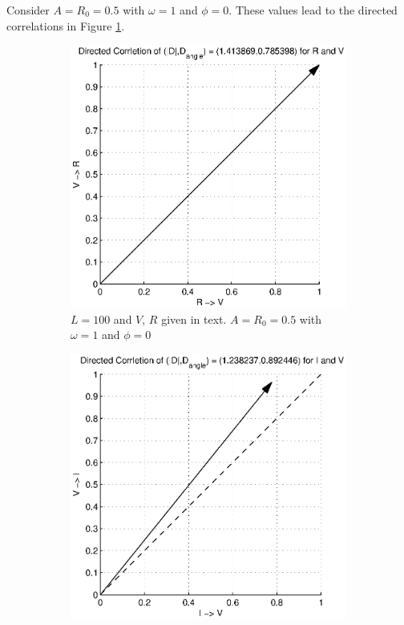 \documentclass[a4paper,11pt]{article}
\begin{document}
Consider $A=R_0=0.5$ with $\omega=1$ and $\phi=0$.  These values lead to the directed correlations in Figure \ref{fig:RL_Rsin2VsinCCMVR}.
\begin{figure}[h!t]
\centering
\begin{subfigure}[b]{0.25\textwidth}
\label{fig:RL_Rsin2VsinCCMVR}
\includegraphics[scale=0.4]{graphics/RL_Rsin2VsinCCMVR.eps}
\caption{$L = 100$ and $V$, $R$ given in text. $A=R_0=0.5$ with $\omega=1$ and $\phi=0$}
\end{subfigure}
\begin{subfigure}[b]{0.25\textwidth}
\label{fig:RL_Rsin2VsinCCMVI}
\includegraphics[scale=0.4]{graphics/RL_Rsin2VsinCCMVI.eps}

\end{subfigure}
\end{figure}
\end{document}
